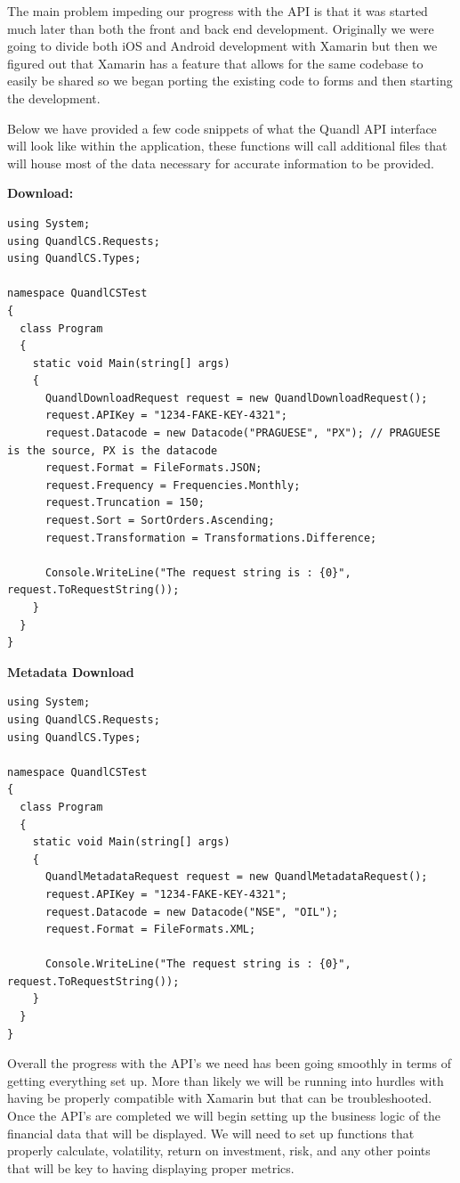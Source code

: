 \documentclass[letterpaper,10pt,titlepage,journal,compsoc,draftclsnofoot,onecolumn]{IEEEtran}
\begin{document}
The main problem impeding our progress with the API is that it was started much later than both the front and back end development. Originally we were going to divide both iOS and Android development with Xamarin but then we figured out that Xamarin has a feature that allows for the same codebase to easily be shared so we began porting the existing code to forms and then starting the development. 

Below we have provided a few code snippets of what the Quandl API interface will look like within the application, these functions will call additional files that will house most of the data necessary for accurate information to be provided. 

 \textbf{Download:} 
\begin{lstlisting}
using System;
using QuandlCS.Requests;
using QuandlCS.Types;

namespace QuandlCSTest
{
  class Program
  {
    static void Main(string[] args)
    {
      QuandlDownloadRequest request = new QuandlDownloadRequest();
      request.APIKey = "1234-FAKE-KEY-4321";
      request.Datacode = new Datacode("PRAGUESE", "PX"); // PRAGUESE is the source, PX is the datacode
      request.Format = FileFormats.JSON;
      request.Frequency = Frequencies.Monthly;
      request.Truncation = 150;
      request.Sort = SortOrders.Ascending;
      request.Transformation = Transformations.Difference;

      Console.WriteLine("The request string is : {0}", request.ToRequestString());
    }
  }
}
\end{lstlisting}

\textbf{Metadata Download}
\begin{lstlisting}
using System;
using QuandlCS.Requests;
using QuandlCS.Types;

namespace QuandlCSTest
{
  class Program
  {
    static void Main(string[] args)
    {
      QuandlMetadataRequest request = new QuandlMetadataRequest();
      request.APIKey = "1234-FAKE-KEY-4321";
      request.Datacode = new Datacode("NSE", "OIL");      
      request.Format = FileFormats.XML;

      Console.WriteLine("The request string is : {0}", request.ToRequestString());
    }
  }
}
\end{lstlisting}

Overall the progress with the API's we need has been going smoothly in terms of getting everything set up. More than likely we will be running into hurdles with having be properly compatible with Xamarin but that can be troubleshooted. Once the API's are completed we will begin setting up the business logic of the financial data that will be displayed. We will need to set up functions that properly calculate, volatility, return on investment, risk, and any other points that will be key to having displaying proper metrics. 
\end{document}
